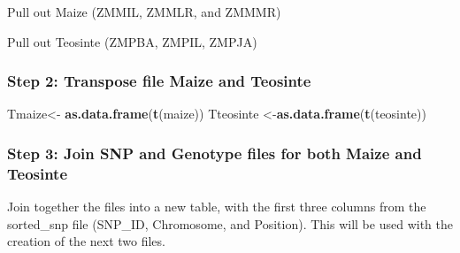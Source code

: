 \documentclass[]{article}
\newenvironment{Shaded}{\begin{snugshade}}{\end{snugshade}}
\newcommand{\KeywordTok}[1]{\textcolor[rgb]{0.13,0.29,0.53}{\textbf{#1}}}
\newcommand{\NormalTok}[1]{#1}
\newcommand{\OperatorTok}[1]{\textcolor[rgb]{0.81,0.36,0.00}{\textbf{#1}}}
\newcommand{\StringTok}[1]{\textcolor[rgb]{0.31,0.60,0.02}{#1}}
\begin{document}
Pull out Maize (ZMMIL, ZMMLR, and ZMMMR)

\begin{Shaded}
\end{Shaded}

Pull out Teosinte (ZMPBA, ZMPIL, ZMPJA)

\begin{Shaded}
\end{Shaded}

\hypertarget{step-2-transpose-file-maize-and-teosinte}{%
\subsubsection{Step 2: Transpose file Maize and
Teosinte}\label{step-2-transpose-file-maize-and-teosinte}}

\begin{Shaded}
\begin{Highlighting}[]
\NormalTok{Tmaize<-}\StringTok{ }\KeywordTok{as.data.frame}\NormalTok{(}\KeywordTok{t}\NormalTok{(maize))}
\NormalTok{Tteosinte <-}\KeywordTok{as.data.frame}\NormalTok{(}\KeywordTok{t}\NormalTok{(teosinte))}
\end{Highlighting}
\end{Shaded}

\hypertarget{step-3-join-snp-and-genotype-files-for-both-maize-and-teosinte}{%
\subsubsection{Step 3: Join SNP and Genotype files for both Maize and
Teosinte}\label{step-3-join-snp-and-genotype-files-for-both-maize-and-teosinte}}

Join together the files into a new table, with the first three columns
from the sorted\_snp file (SNP\_ID, Chromosome, and Position). This will
be used with the creation of the next two files.
\end{document}
